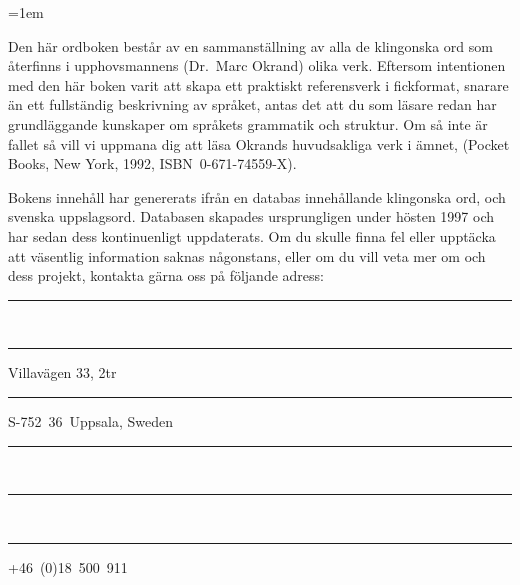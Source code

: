 %
%
%


\parindent=1em                                  %

\raggedbottom
{}

\noindent Den här ordboken består av en sammanställning av alla de
klingonska ord som återfinns i upphovsmannens (Dr.\ Marc Okrand) olika
verk. Eftersom intentionen med den här boken varit att skapa ett
praktiskt referensverk i fickformat, snarare än ett fullständig
beskrivning av språket, antas det att du som läsare redan har
grundläggande kunskaper om språkets grammatik och struktur. Om så inte
är fallet så vill vi uppmana dig att läsa Okrands huvudsakliga verk i
ämnet,  (Pocket Books, New York, 1992,
ISBN~0-671-74559-X).

Bokens innehåll har genererats ifrån en databas innehållande
\fromkliwords{} klingonska ord, och \tokliwords{} svenska
uppslagsord. Databasen skapades ursprungligen under hösten 1997 och
har sedan dess kontinuenligt uppdaterats. Om du skulle finna fel eller
upptäcka att väsentlig information saknas någonstans, eller om du vill
veta mer om  och dess projekt,
kontakta gärna oss på följande adress:


\vspace{3mm}%
\noindent\parbox[t]{.5\textwidth}{%
  \rule{1.25cm}{0mm}\\
  \rule{1.25cm}{0mm}Villavägen 33, 2tr\\
  \rule{1.25cm}{0mm}S-752~36~Uppsala, Sweden%
}%
\parbox[t]{.5\textwidth}{%
  \rule{1.75cm}{0mm}\\
  \rule{1.75cm}{0mm}\\
  \rule{1.75cm}{0mm}+46~(0)18~500~911%
}


